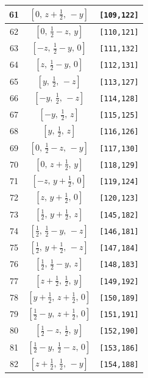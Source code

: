 \documentclass[fleqn,8pt]{jsarticle}
\begin{document}
\begin{longtable}{ccc}
61 & $\left[ 0,\, z + \frac{1}{2},\, - y \right]$ & {\tt [109,122]} \\ \hline
62 & $\left[ 0,\, \frac{1}{2} - z,\, y \right]$ & {\tt [110,121]} \\ \hline
63 & $\left[ - z,\, \frac{1}{2} - y,\, 0 \right]$ & {\tt [111,132]} \\ \hline
64 & $\left[ z,\, \frac{1}{2} - y,\, 0 \right]$ & {\tt [112,131]} \\ \hline
65 & $\left[ y,\, \frac{1}{2},\, - z \right]$ & {\tt [113,127]} \\ \hline
66 & $\left[ - y,\, \frac{1}{2},\, - z \right]$ & {\tt [114,128]} \\ \hline
67 & $\left[ - y,\, \frac{1}{2},\, z \right]$ & {\tt [115,125]} \\ \hline
68 & $\left[ y,\, \frac{1}{2},\, z \right]$ & {\tt [116,126]} \\ \hline
69 & $\left[ 0,\, \frac{1}{2} - z,\, - y \right]$ & {\tt [117,130]} \\ \hline
70 & $\left[ 0,\, z + \frac{1}{2},\, y \right]$ & {\tt [118,129]} \\ \hline
71 & $\left[ - z,\, y + \frac{1}{2},\, 0 \right]$ & {\tt [119,124]} \\ \hline
72 & $\left[ z,\, y + \frac{1}{2},\, 0 \right]$ & {\tt [120,123]} \\ \hline
73 & $\left[ \frac{1}{2},\, y + \frac{1}{2},\, z \right]$ & {\tt [145,182]} \\ \hline
74 & $\left[ \frac{1}{2},\, \frac{1}{2} - y,\, - z \right]$ & {\tt [146,181]} \\ \hline
75 & $\left[ \frac{1}{2},\, y + \frac{1}{2},\, - z \right]$ & {\tt [147,184]} \\ \hline
76 & $\left[ \frac{1}{2},\, \frac{1}{2} - y,\, z \right]$ & {\tt [148,183]} \\ \hline
77 & $\left[ z + \frac{1}{2},\, \frac{1}{2},\, y \right]$ & {\tt [149,192]} \\ \hline
78 & $\left[ y + \frac{1}{2},\, z + \frac{1}{2},\, 0 \right]$ & {\tt [150,189]} \\ \hline
79 & $\left[ \frac{1}{2} - y,\, z + \frac{1}{2},\, 0 \right]$ & {\tt [151,191]} \\ \hline
80 & $\left[ \frac{1}{2} - z,\, \frac{1}{2},\, y \right]$ & {\tt [152,190]} \\ \hline
81 & $\left[ \frac{1}{2} - y,\, \frac{1}{2} - z,\, 0 \right]$ & {\tt [153,186]} \\ \hline
82 & $\left[ z + \frac{1}{2},\, \frac{1}{2},\, - y \right]$ & {\tt [154,188]} \\ \hline

\end{longtable}
\end{document}
